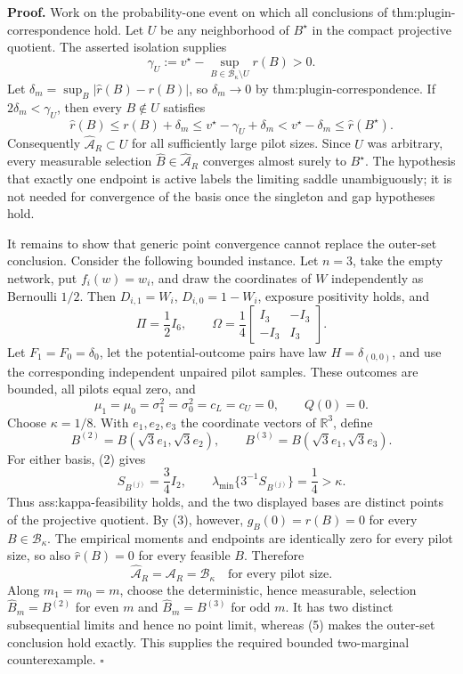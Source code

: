 \textbf{Proof.}
Work on the probability-one event on which all conclusions of thm:plugin-correspondence hold.  Let \(U\) be any neighborhood of \(B^\star\) in the compact projective quotient.  The asserted isolation supplies
\[
\gamma_U:=v^\star-\sup_{B\in\mathcal B_\kappa\setminus U}r(B)>0.
\tag{1}
\]
Let \(\delta_m=\sup_B|\widehat r(B)-r(B)|\), so \(\delta_m\to0\) by thm:plugin-correspondence.  If \(2\delta_m<\gamma_U\), then every \(B\notin U\) satisfies
\[
\widehat r(B)\le r(B)+\delta_m
\le v^\star-\gamma_U+\delta_m
< v^\star-\delta_m
\le\widehat r(B^\star).
\]
Consequently \(\widehat{\mathcal A}_R\subset U\) for all sufficiently large pilot sizes.  Since \(U\) was arbitrary, every measurable selection \(\widehat B\in\widehat{\mathcal A}_R\) converges almost surely to \(B^\star\).  The hypothesis that exactly one endpoint is active labels the limiting saddle unambiguously; it is not needed for convergence of the basis once the singleton and gap hypotheses hold.

It remains to show that generic point convergence cannot replace the outer-set conclusion.  Consider the following bounded instance.  Let \(n=3\), take the empty network, put \(f_i(w)=w_i\), and draw the coordinates of \(W\) independently as Bernoulli \(1/2\).  Then \(D_{i,1}=W_i\), \(D_{i,0}=1-W_i\), exposure positivity holds, and
\[
\Pi=\frac12I_6,
\qquad
\Omega=\frac14
\begin{bmatrix}I_3&-I_3\\-I_3&I_3\end{bmatrix}.
\tag{2}
\]
Let \(F_1=F_0=\delta_0\), let the potential-outcome pairs have law \(H=\delta_{(0,0)}\), and use the corresponding independent unpaired pilot samples.  These outcomes are bounded, all pilots equal zero, and
\[
\mu_1=\mu_0=\sigma_1^2=\sigma_0^2=c_L=c_U=0,
\qquad Q(0)=0.
\tag{3}
\]
Choose \(\kappa=1/8\).  With \(e_1,e_2,e_3\) the coordinate vectors of \(\mathbb R^3\), define
\[
B^{(2)}=B(\sqrt3e_1,\sqrt3e_2),
\qquad
B^{(3)}=B(\sqrt3e_1,\sqrt3e_3).
\]
For either basis, (2) gives
\[
S_{B^{(j)}}=\frac34I_2,
\qquad
\lambda_{\min}\{3^{-1}S_{B^{(j)}}\}=\frac14>\kappa.
\tag{4}
\]
Thus ass:kappa-feasibility holds, and the two displayed bases are distinct points of the projective quotient.  By (3), however, \(g_B(0)=r(B)=0\) for every \(B\in\mathcal B_\kappa\).  The empirical moments and endpoints are identically zero for every pilot size, so also \(\widehat r(B)=0\) for every feasible \(B\).  Therefore
\[
\widehat{\mathcal A}_R=\mathcal A_R=\mathcal B_\kappa
\quad\text{for every pilot size}.
\tag{5}
\]
Along \(m_1=m_0=m\), choose the deterministic, hence measurable, selection \(\widehat B_m=B^{(2)}\) for even \(m\) and \(\widehat B_m=B^{(3)}\) for odd \(m\).  It has two distinct subsequential limits and hence no point limit, whereas (5) makes the outer-set conclusion hold exactly.  This supplies the required bounded two-marginal counterexample. \(\square\)
